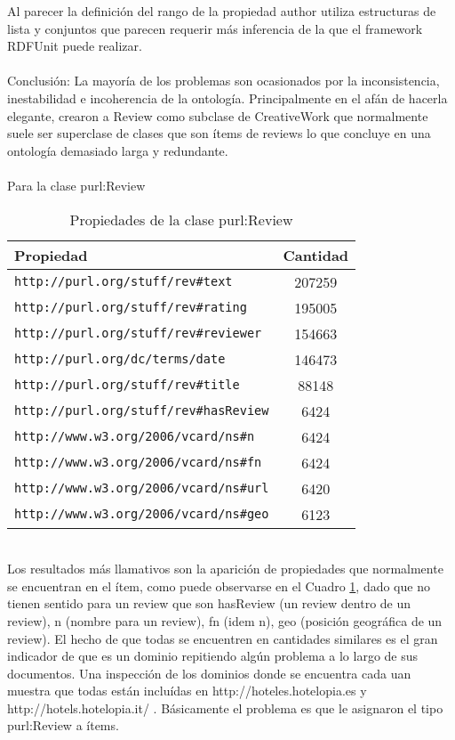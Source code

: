  Al parecer la definición del rango de la propiedad author utiliza estructuras de lista y conjuntos que parecen requerir más inferencia de la 
 que el framework RDFUnit puede realizar.
 \\\\
 Conclusión: La mayoría de los problemas son ocasionados por la inconsistencia, inestabilidad e incoherencia de la ontología. Principalmente 
 en el afán de hacerla elegante, crearon a Review como subclase de CreativeWork que normalmente suele ser superclase de clases que son ítems de reviews
 lo que concluye en una ontología demasiado larga y redundante.
 \\
 \\
 Para la clase purl:Review\\
 \begin{table}[h]
 \begin{tabular}{| l | c | }\hline
 Propiedad & Cantidad \\\hline
 \verb|http://purl.org/stuff/rev#text| & 207259\\
 \verb|http://purl.org/stuff/rev#rating| & 195005\\
 \verb|http://purl.org/stuff/rev#reviewer| & 154663\\
 \verb|http://purl.org/dc/terms/date| & 146473\\
 \verb|http://purl.org/stuff/rev#title| & 88148\\
 \verb|http://purl.org/stuff/rev#hasReview| & 6424\\
 \verb|http://www.w3.org/2006/vcard/ns#n| & 6424\\
 \verb|http://www.w3.org/2006/vcard/ns#fn| & 6424\\
 \verb|http://www.w3.org/2006/vcard/ns#url| & 6420\\
 \verb|http://www.w3.org/2006/vcard/ns#geo| & 6123\\\hline
\end{tabular}
\caption{Propiedades de la clase purl:Review}
\label{table:PropertiesStatisticsPurl}
\end{table}
\\ 

Los resultados más llamativos son la aparición de propiedades que normalmente se encuentran en el ítem, como puede observarse en el Cuadro \ref{table:PropertiesStatisticsPurl},
dado que no tienen sentido para un review que son hasReview (un review dentro de un review), n (nombre para un review), fn (idem n),
geo (posición geográfica de un review). El hecho de que todas se encuentren en cantidades similares es el gran indicador de que es 
un dominio repitiendo algún problema a lo largo de sus documentos. Una inspección de los dominios donde se encuentra cada uan muestra
que todas están incluídas en http://hoteles.hotelopia.es y http://hotels.hotelopia.it/ .
Básicamente el problema es que le asignaron el tipo purl:Review a ítems.
 
